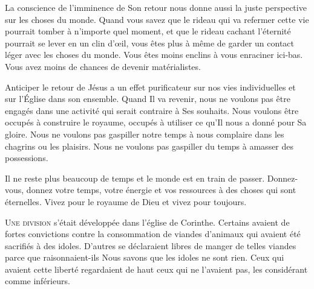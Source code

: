 
La conscience de l'imminence de Son retour nous donne aussi
 la juste perspective sur les choses du monde.
 Quand vous savez que le rideau qui va refermer cette vie
 pourrait tomber à n'importe quel moment,
 et que le rideau cachant l'éternité pourrait se lever en un clin d'\oe{}il,
 vous êtes plus à même de garder un contact léger avec les choses du monde.
 Vous êtes moins enclins à vous enraciner ici-bas.
 Vous avez moins de chances de devenir matérialistes.

Anticiper le retour de Jésus a un effet purificateur
 sur nos vies individuelles et sur l'Église dans son ensemble.
 Quand Il va revenir, nous ne voulons pas être engagés dans une activité
 qui serait contraire à Ses souhaits.
 Nous voulons être occupés à construire le royaume,
 occupés à utiliser ce qu'Il nous a donné pour Sa gloire.
 Nous ne voulons pas gaspiller notre temps à nous complaire
 dans les chagrins ou les plaisirs.
 Nous ne voulons pas gaspiller du temps à amasser des possessions.

Il ne reste plus beaucoup de temps et le monde est en train de passer.
 Donnez-vous, donnez votre temps, votre énergie et vos ressources
 à des choses qui sont éternelles.
 Vivez pour le royaume de Dieu et vivez pour toujours.

\dvrule







\lettrine{U}{ne division} s'était développée dans l'église de Corinthe.
 Certains avaient de fortes convictions
 contre la consommation de viandes d'animaux
 qui avaient été sacrifiés à des idoles.
 D'autres se déclaraient libres de manger
 de telles viandes parce que \ocadr raisonnaient-ils \fcadr{}
 \og Nous savons que les idoles ne sont rien. \fg{}
 Ceux qui avaient cette liberté regardaient de haut
 ceux qui ne l'avaient pas, les considérant comme inférieurs.

